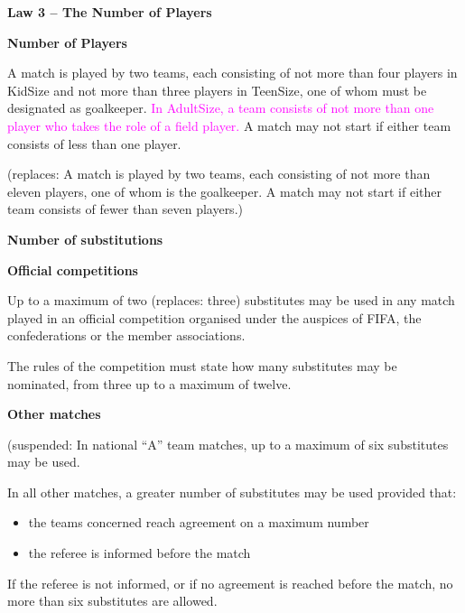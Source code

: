 \clearpage
\sffamily

{\bfseries\color[rgb]{0.4,0.4,0.4}
Law 3 -- The Number of Players}


\bigskip

{\bfseries Number of Players}

\headlinebox

A match is played by two teams, each consisting of not more than four players in KidSize and not more than three players in TeenSize, one of whom must be designated as goalkeeper. \textcolor{magenta}{In AdultSize, a team consists of not more than one player who takes the role of a field player.} A match may not start if either team consists of less than one player.

{\color[rgb]{0.4,0.4,0.4}
(replaces: A match is played by two teams, each consisting of not more than eleven players, one of whom is the goalkeeper. A match may not start if either team consists of fewer than seven players.)}

\bigskip

{\bfseries Number of substitutions}

\headlinebox
 
{\bfseries Official competitions }

Up to a maximum of two {\color[rgb]{0.4,0.4,0.4}(replaces: three)} substitutes may be used in any match played in an official competition organised under the auspices of FIFA, the confederations or the member associations.

The rules of the competition must state how many substitutes may be nominated, from three up to a maximum of twelve.

\bigskip

{\bfseries Other matches }

{\color[rgb]{0.4,0.4,0.4}
(suspended:
In national ``A'' team matches, up to a maximum of six substitutes may be used.

\bigskip

In all other matches, a greater number of substitutes may be used provided that:

\begin{itemize}
\item the teams concerned reach agreement on a maximum number 
\item the referee is informed before the match
\end{itemize}

If the referee is not informed, or if no agreement is reached before the match, no more than six substitutes are allowed.}


